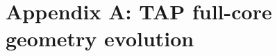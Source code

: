 \chapter{Appendix A: TAP full-core geometry evolution} 
\label{appex:geometries}
\setcounter{figure}{0}  

